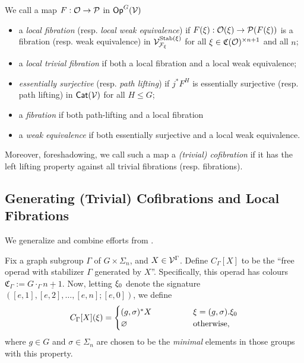 \documentclass[psamsfonts,onesided,10pt,letterpaper]{amsart}%
\renewcommand{\C}{\ensuremath{\mathfrak{C}}}
\renewcommand{\F}{\mathcal F}
\renewcommand{\1}{\ensuremath{\mathbb{id}}}
\renewcommand{\P}{\ensuremath{\mathcal{P}}}
\begin{document}
\begin{definition}
  We call a map $F: \O \to \P$ in $\mathsf{Op}^G(\mathcal V)$
  \begin{itemize}
  \item a {\em local fibration} (resp. {\em local weak equivalence}) if
        $F(\ksi): \O(\ksi)\to \P(F(\ksi))$
        is a fibration (resp. weak equivalence) in $\V^{\Stab(\ksi)}_{\F_\ksi}$ for all $\ksi\in \C(\O)^{\times n+1}$ and all $n$;
  \item a {\em local trivial fibration} if both a local fibration and a local weak equivalence;
  \item {\em essentially surjective} (resp. {\em path lifting}) if $j^*F^H$ is essentially surjective (resp. path lifting) in $\mathsf{Cat}(\mathcal V)$ for all $H\leq G$;
  \item a {\em fibration} if both path-lifting and a local fibration
  \item a {\em weak equivalence} if both essentially surjective and a local weak equivalence.
  \end{itemize}

  Moreover, foreshadowing, we call such a map
  a \textit{(trivial) cofibration} if it has the left lifting property against all trivial fibrations (resp. fibrations).
\end{definition}

\subsection{Generating (Trivial) Cofibrations and Local Fibrations}

We generalize and combine efforts from \cite{CM13b, BM13, Cav14}.

Fix a graph subgroup $\Gamma$ of $G \times \Sigma_n$, and $X \in \mathcal V^\Gamma$.
Define $C_\Gamma[X]$ to be the ``free operad with stabilizer $\Gamma$ generated by $X$''.
Specifically, this operad has colours $\mathfrak C_\Gamma := G \cdot_\Gamma \underline{n+1}$.
Now, letting $\xi_0$ denote the signature $([e,1],[e,2],\dots,[e,n];[e,0])$,
we define
\begin{equation}
      C_\Gamma[X](\ksi) =
      \begin{cases}
            (g,\sigma)^{\**} X \qquad \qquad & \ksi = (g,\sigma).\ksi_0
            \\
            \varnothing & \mbox{otherwise,}
      \end{cases}
\end{equation}
where $g \in G$ and $\sigma \in \Sigma_n$ are chosen to be the \textit{minimal} elements in those groups with this property.
\end{document}
